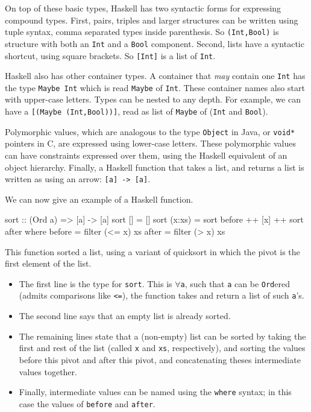 \documentclass[11pt]{article}
\begin{document}
On top of these basic types, Haskell has two syntactic forms for expressing
compound types.
First, pairs, triples and larger structures can be written using tuple syntax,
comma separated types inside parenthesis.
So \verb|(Int,Bool)| is structure with both an \verb|Int| and a \verb|Bool| component.
Second, lists have a syntactic shortcut, using square brackets.
So \verb|[Int]| is a list of \verb|Int|.

Haskell also has other container types. A container
that {\em may\/} contain one \verb|Int| has the type
\verb|Maybe Int|
which is read \verb|Maybe| of \verb|Int|.
These container names also start with upper-case letters.
Types can be nested to any depth. For example, we can have a \verb|[(Maybe (Int,Bool))]|,
read as list of \verb|Maybe| of (\verb|Int| and \verb|Bool|).

Polymorphic values, which are analogous to the type \verb|Object| in Java,
or \verb|void*| pointers in C, are expressed using lower-case letters.
These polymorphic values can have constraints expressed over them,
using the Haskell equivalent of an object hierarchy.
Finally, a Haskell function that takes a list, and returns a list
is written as using an arrow: \verb|[a] -> [a]|.

We can now give an example of a Haskell function.%
\begin{Code}

sort :: (Ord a) => [a] -> [a]
sort []     = []
sort (x:xs) = sort before ++ [x] ++ sort after
  where
        before = filter (<= x) xs
        after  = filter (> x) xs

\end{Code}
This function sorted a list, using a variant of quicksort in which the pivot is
the first element of the list.
\begin{itemize}
\item The first line is the type for \verb|sort|. This is $\forall$\verb|a|, such that
\verb|a| can be \verb|Ord|ered (admits comparisons like \verb|<=|), the function
takes and return a list of such \verb|a|'s.
\item The second line says that an empty list is already sorted.
\item The remaining lines state that a (non-empty) list can be
sorted by taking the first and rest of the list (called \verb|x| and \verb|xs|, respectively),
and sorting the values before this pivot and after this pivot,
and concatenating theses intermediate values together.
\item Finally, intermediate values can be named using the \verb|where| syntax;
in this case the values of \verb|before| and \verb|after|.
\end{itemize}
\end{document}
